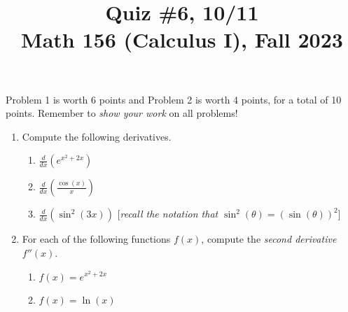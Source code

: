 \documentclass[11pt]{article}
\title{Quiz \#6, 10/11 \\ Math 156 (Calculus I), Fall 2023}
\date{}
\begin{document}
\maketitle

\thispagestyle{empty}

\vspace{-2cm}

Problem 1 is worth 6 points and Problem 2 is worth 4 points, for a total of 10 points. Remember to \emph{show your work} on all problems!

\begin{enumerate}
\item Compute the following derivatives.
\begin{enumerate}
\item $\displaystyle \frac{d}{dx} \left( e^{x^2+2x} \right)$
\item $\displaystyle \frac{d}{dx} \left( \frac{\cos(x)}{x} \right)$
\item $\displaystyle \frac{d}{dx} \left( \sin^2(3x) \right) $ \hfill [\emph{recall the notation that $\sin^2(\theta)= (\sin(\theta))^2$}]
\end{enumerate}

\vspace{2.6in}

\item For each of the following functions $f(x)$, compute the \emph{second derivative} $f''(x)$.
\begin{enumerate}
\item $f(x) = e^{x^2+2x}$
\item $f(x) = \ln(x)$
\end{enumerate}
\end{enumerate}
\end{document}
